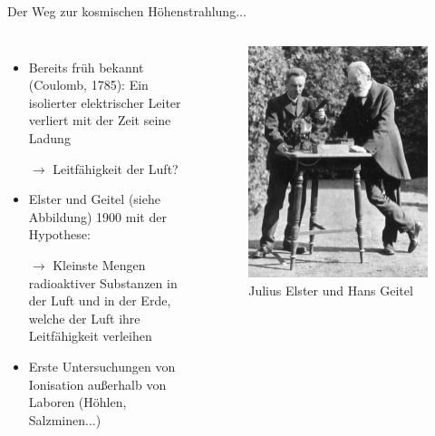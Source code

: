 \documentclass[aspectratio=1610, professionalfonts, 9pt, hyperref={colorlinks=false}]{beamer}
\begin{document}
\begin{frame}{Der Weg zur kosmischen Höhenstrahlung...}
  \begin{columns}
      \begin{itemize}
        \setlength\itemsep{0.5em}
        \item Bereits früh bekannt (Coulomb, 1785): Ein isolierter elektrischer Leiter verliert mit der Zeit seine Ladung
        \item [$\rightarrow$] Leitfähigkeit der Luft?
        \item Elster und Geitel (siehe Abbildung) 1900 mit der Hypothese:
        \item [$\rightarrow$] Kleinste Mengen radioaktiver Substanzen in der Luft und in der Erde, welche der Luft ihre Leitfähigkeit verleihen
        \item Erste Untersuchungen von Ionisation außerhalb von Laboren (Höhlen, Salzminen...)
      \end{itemize}
        \vspace*{10px}
  
      \begin{figure}
          \centering
          \includegraphics[width=0.7\linewidth]{images/Julius-Elster-and-Hans-Geitel-experimenting-in-the-garden-of-Elsters-house-The.png}
          \caption{Julius Elster und Hans Geitel \cite{article}}
      \end{figure}
  \end{columns}
\end{frame}
\end{document}
